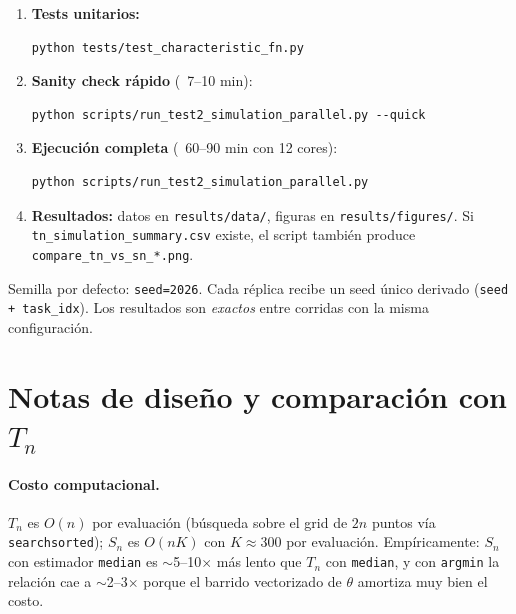 \documentclass[11pt,a4paper]{article}
\begin{document}
\begin{enumerate}[leftmargin=*]
    \item \textbf{Tests unitarios:}
    \begin{lstlisting}[style=shellstyle]
python tests/test_characteristic_fn.py
    \end{lstlisting}
    \item \textbf{Sanity check rápido} (~7--10 min):
    \begin{lstlisting}[style=shellstyle]
python scripts/run_test2_simulation_parallel.py --quick
    \end{lstlisting}
    \item \textbf{Ejecución completa} (~60--90 min con 12 cores):
    \begin{lstlisting}[style=shellstyle]
python scripts/run_test2_simulation_parallel.py
    \end{lstlisting}
    \item \textbf{Resultados:} datos en \texttt{results/data/}, figuras
    en \texttt{results/figures/}. Si \texttt{tn\_simulation\_summary.csv}
    existe, el script también produce \texttt{compare\_tn\_vs\_sn\_*.png}.
\end{enumerate}

\begin{notebox}[title=Reproducibilidad]
Semilla por defecto: \texttt{seed=2026}. Cada réplica recibe un seed
único derivado (\texttt{seed + task\_idx}). Los resultados son
\emph{exactos} entre corridas con la misma configuración.
\end{notebox}

\section{Notas de diseño y comparación con \texorpdfstring{$T_n$}{Tn}}

\paragraph{Costo computacional.} $T_n$ es $O(n)$ por evaluación (búsqueda
sobre el grid de $2n$ puntos vía \texttt{searchsorted}); $S_n$ es
$O(nK)$ con $K\approx 300$ por evaluación. Empíricamente: $S_n$ con
estimador \texttt{median} es $\sim$5--10$\times$ más lento que $T_n$
con \texttt{median}, y con \texttt{argmin} la relación cae a
$\sim$2--3$\times$ porque el barrido vectorizado de $\theta$ amortiza
muy bien el costo.
\end{document}
